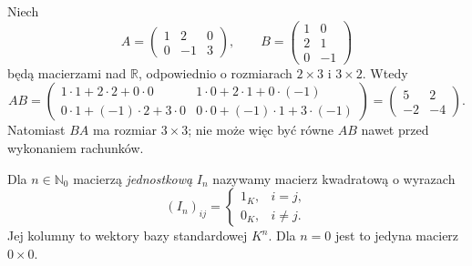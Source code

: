 \begin{przyklad}
\label{prz:lin4-mnozenie}
Niech
\[
 A=\begin{pmatrix}1&2&0\\0&-1&3\end{pmatrix},
 \qquad
 B=\begin{pmatrix}1&0\\2&1\\0&-1\end{pmatrix}
\]
będą macierzami nad \(\mathbb R\),
odpowiednio o rozmiarach \(2\times3\)
i \(3\times2\). Wtedy
\[
 AB=
 \begin{pmatrix}
 1\cdot1+2\cdot2+0\cdot0&
 1\cdot0+2\cdot1+0\cdot(-1)\\
 0\cdot1+(-1)\cdot2+3\cdot0&
 0\cdot0+(-1)\cdot1+3\cdot(-1)
 \end{pmatrix}
 =\begin{pmatrix}5&2\\-2&-4\end{pmatrix}.
\]
Natomiast \(BA\) ma rozmiar \(3\times3\);
nie może więc być równe \(AB\)
nawet przed wykonaniem rachunków.
\end{przyklad}

\begin{definicja}
\label{def:lin4-jednostkowa}
Dla \(n\in\mathbb N_0\)
macierzą \emph{jednostkową} \(I_n\)
nazywamy macierz kwadratową
o wyrazach
\[
 (I_n)_{ij}=
 \begin{cases}
 1_K,&i=j,\\
 0_K,&i\neq j.
 \end{cases}
\]
Jej kolumny to wektory bazy standardowej \(K^n\).
Dla \(n=0\) jest to jedyna macierz \(0\times0\).
\end{definicja}

